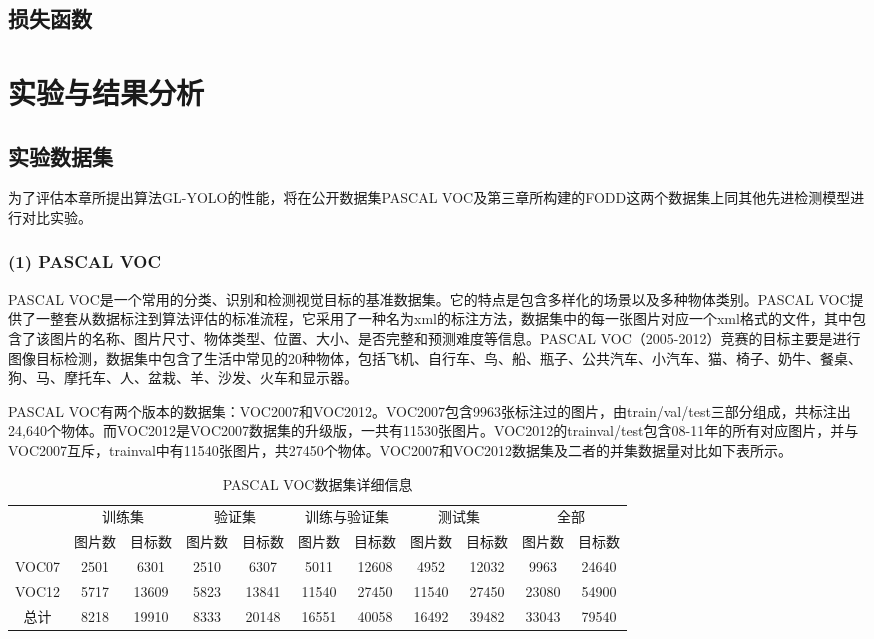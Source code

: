 \subsection{损失函数}

\section{实验与结果分析}
\subsection{实验数据集}
为了评估本章所提出算法GL-YOLO的性能，将在公开数据集PASCAL VOC及第三章所构建的FODD这两个数据集上同其他先进检测模型进行对比实验。
\subsubsection*{(1) PASCAL VOC}
PASCAL VOC\cite{pascalvoc07, pascalvoc12}是一个常用的分类、识别和检测视觉目标的基准数据集。它的特点是包含多样化的场景以及多种物体类别。PASCAL VOC提供了一整套从数据标注到算法评估的标准流程，它采用了一种名为xml的标注方法，数据集中的每一张图片对应一个xml格式的文件，其中包含了该图片的名称、图片尺寸、物体类型、位置、大小、是否完整和预测难度等信息。PASCAL VOC（2005-2012）竞赛的目标主要是进行图像目标检测，数据集中包含了生活中常见的20种物体，包括飞机、自行车、鸟、船、瓶子、公共汽车、小汽车、猫、椅子、奶牛、餐桌、狗、马、摩托车、人、盆栽、羊、沙发、火车和显示器。

PASCAL VOC有两个版本的数据集：VOC2007和VOC2012。VOC2007包含9963张标注过的图片，由train/val/test三部分组成，共标注出24,640个物体。而VOC2012是VOC2007数据集的升级版，一共有11530张图片。VOC2012的trainval/test包含08-11年的所有对应图片，并与VOC2007互斥，trainval中有11540张图片，共27450个物体。VOC2007和VOC2012数据集及二者的并集数据量对比如下表所示。
\begin{table}[htbp]
	\centering
	\small
	\caption{PASCAL VOC数据集详细信息}
	\setlength{\tabcolsep}{1.3mm}
	\begin{tabular}{ccccccccccc}
		\toprule[2pt]
		\multirow{2}[4]{*}{} & \multicolumn{2}{c}{训练集} & \multicolumn{2}{c}{验证集} & \multicolumn{2}{c}{训练与验证集} & \multicolumn{2}{c}{测试集} & \multicolumn{2}{c}{全部} \\
		\cmidrule{2-11}          & 图片数   & 目标数   & 图片数   & 目标数   & 图片数   & 目标数   & 图片数   & 目标数   & 图片数   & 目标数 \\
		\midrule
		VOC07 & 2501  & 6301  & 2510  & 6307  & 5011  & 12608 & 4952  & 12032 & 9963  & 24640 \\
		VOC12 & 5717  & 13609 & 5823  & 13841 & 11540 & 27450 & {\color{red} 11540} & {\color{red} 27450} & {\color{red} 23080} & {\color{red} 54900} \\
		总计    & 8218  & 19910 & 8333  & 20148 & 16551 & 40058 & {\color{red} 16492} & {\color{red} 39482} & {\color{red} 33043} & {\color{red} 79540} \\
		\bottomrule[2pt]
	\end{tabular}%
	\label{pascal voc}%
\end{table}%


